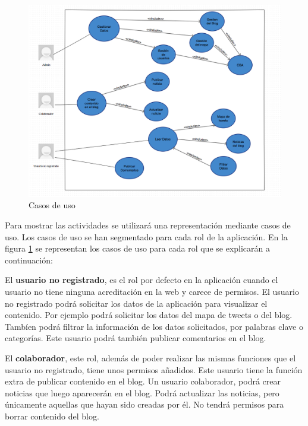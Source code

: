 \begin{landscape}
\begin{figure}
\begin{center}
\includegraphics[width=16cm]{imagenes/casos-de-uso.png}
\caption{Casos de uso}
\label{casos_uso}
\end{center}
\end{figure}
\end{landscape}

Para mostrar las actividades se utilizará una representación mediante casos de uso. Los casos de uso se han segmentado para cada rol de la aplicación. En la figura \ref{casos_uso}  se representan los casos de uso para cada rol que se explicarán a continuación:

\vspace{5 mm}

El \textbf{usuario no registrado}, es el rol por defecto en la aplicación cuando el usuario no tiene ninguna acreditación en la web y carece de permisos. El usuario no registrado podrá solicitar los datos de la aplicación para visualizar el contenido. Por ejemplo podrá solicitar los datos del mapa de tweets o del blog. Tambíen podrá filtrar la información de los datos solicitados, por palabras clave o categorías. Este usuario podrá también publicar comentarios en el blog.

\vspace{5 mm}

El \textbf{colaborador}, este rol, además de poder realizar las mismas funciones que el usuario no registrado, tiene unos permisos añadidos. Este usuario tiene la función extra de publicar contenido en el blog. Un usuario colaborador, podrá crear noticias que luego aparecerán en el blog. Podrá actualizar las noticias, pero únicamente aquellas que hayan sido creadas por él. No tendrá permisos para borrar contenido del blog.


